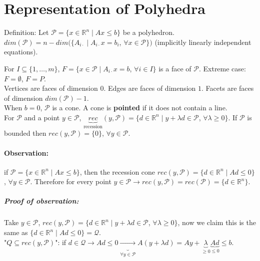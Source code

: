 \documentclass[main]{subfiles}
\begin{document}

\section{Representation of Polyhedra}
Definition: Let $\mathcal{P} = \{x \in \mathbb{R}^n \mid Ax \leq b\}$ be a 
polyhedron. $dim(\mathcal{P}) = n - dim(\{A_{i\cdot} \mid A_{i\cdot}x = b_i$, $
\forall x \in \mathcal{P} \})$ (implicitly linearly independent equations).

For $I \subseteq \{1, \dots, m\}$, $F = \{ x \in \mathcal{P} \mid A_{i\cdot} x = 
b$, $\forall i \in I \}$ is a face of $\mathcal{P}$.
Extreme case: $F = \emptyset$, $F = P$.\\

Vertices are faces of dimension $0$. Edges are faces of dimension $1$. Facets 
are faces of dimension $dim(\mathcal{P})-1$.\\

When $b = 0$, $\mathcal{P}$ is a cone. A cone is \textbf{pointed} if it does not 
contain a line.\\

For $\mathcal{P}$ and a point $y \in \mathcal{P}$, $\underbrace{rec}
_{\text{recession}}(y, \mathcal{P}) = \{ d \in \mathbb{R}^n \mid y + \lambda d 
\in \mathcal{P}$, $\forall \lambda \geq 0 \}$. If $\mathcal{P}$ is bounded then 
$rec(y, \mathcal{P}) = \{ 0 \}$, $\forall y \in \mathcal{P}$. \\

\paragraph{Observation:}
if $\mathcal{P} = \{x \in \mathbb{R}^n \mid Ax \leq b \}$, then the recession
cone $rec(y, \mathcal{P}) = \{d \in \mathbb{R}^n \mid Ad \leq 0 \}$, $\forall y
\in \mathcal{P}$. Therefore for every point $y \in \mathcal{P} \rightarrow
rec(y, \mathcal{P}) = rec(\mathcal{P}) = \{ d \in \mathbb{R}^n \}$.

\subparagraph{Proof of observation:}
Take $y \in \mathcal{P}$, $rec(y, \mathcal{P}) = \{d \in \mathbb{R}^n \mid y +
\lambda d \in \mathcal{P}$, $\forall \lambda \geq 0 \}$, now we claim this is
the same as $\{d \in \mathbb{R}^n \mid Ad \leq 0 \} = \mathcal{Q}$.\\

"$Q \subseteq rec(y, \mathcal{P})$": if $d \in \mathcal{Q} \rightarrow Ad \leq
0 \underbrace{\rightarrow}_{\forall y \in \mathcal{P}} A (y + \lambda d) = Ay +
\underbrace{\lambda}_{\geq 0} \underbrace{A d}_{\leq 0} \leq b$. \\
\end{document}
